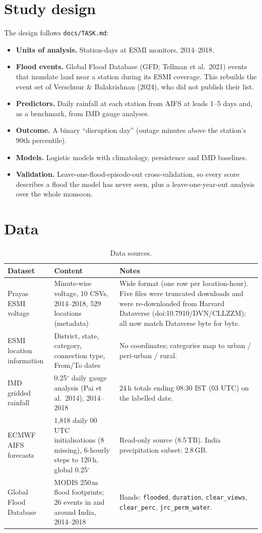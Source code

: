 \documentclass[11pt,a4paper]{article}
\newcommand{\code}[1]{\texttt{\small #1}}
\begin{document}
\section{Study design}
The design follows \code{docs/TASK.md}:
\begin{itemize}
\item \textbf{Units of analysis.} Station-days at ESMI monitors, 2014--2018.
\item \textbf{Flood events.} Global Flood Database (GFD; Tellman et al.\ 2021) events that inundate land near
a station during its ESMI coverage. This rebuilds the event set of Verschuur \& Balakrishnan (2024), who did
not publish their list.
\item \textbf{Predictors.} Daily rainfall at each station from AIFS at leads 1--5 days and, as a benchmark,
from IMD gauge analyses.
\item \textbf{Outcome.} A binary ``disruption day'' (outage minutes above the station's 90th percentile).
\item \textbf{Models.} Logistic models with climatology, persistence and IMD baselines.
\item \textbf{Validation.} Leave-one-flood-episode-out cross-validation, so every score describes a flood the
model has never seen, plus a leave-one-year-out analysis over the whole monsoon.
\end{itemize}

\section{Data}
\begin{table}[H]\centering\small
\caption{Data sources.}
\begin{tabular}{p{3.1cm}p{5.3cm}p{6.8cm}}\toprule
Dataset & Content & Notes \\ \midrule
Prayas ESMI voltage & Minute-wise voltage, 10 CSVs, 2014--2018, 529 locations (metadata) & Wide format (one row per location-hour). Five files were truncated downloads and were re-downloaded from Harvard Dataverse (doi:10.7910/DVN/CLLZZM); all now match Dataverse byte for byte. \\
ESMI location information & District, state, category, connection type, From/To dates & No coordinates; categories map to urban / peri-urban / rural. \\
IMD gridded rainfall & 0.25$^\circ$ daily gauge analysis (Pai et al.\ 2014), 2014--2018 & 24\,h totals ending 08:30 IST (03 UTC) on the labelled date. \\
ECMWF AIFS forecasts & 1,818 daily 00 UTC initialisations (8 missing), 6-hourly steps to 120\,h, global 0.25$^\circ$ & Read-only source (8.5\,TB). India precipitation subset: 2.8\,GB. \\
Global Flood Database & MODIS 250\,m flood footprints; 26 events in and around India, 2014--2018 & Bands: \code{flooded}, \code{duration}, \code{clear\_views}, \code{clear\_perc}, \code{jrc\_perm\_water}. \\
\bottomrule\end{tabular}
\end{table}
\end{document}
